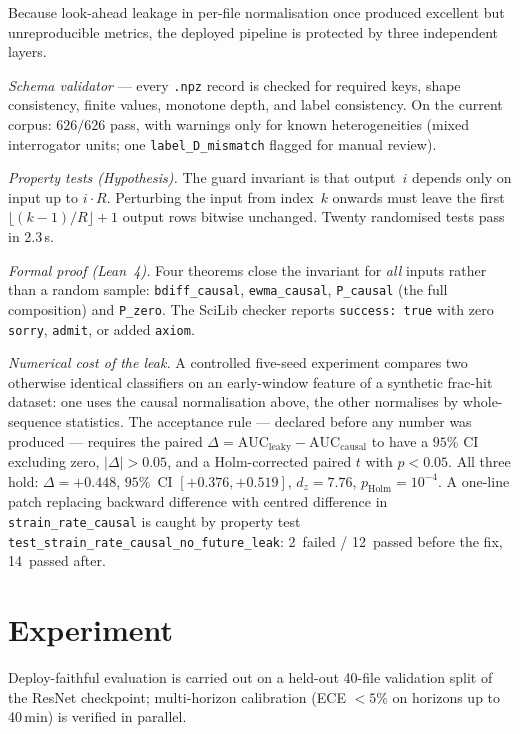 \documentclass{article}
\begin{document}
Because look-ahead leakage in per-file normalisation once produced
excellent but unreproducible metrics, the deployed pipeline is
protected by three independent layers.

\emph{Schema validator} --- every \texttt{.npz} record is checked for
required keys, shape consistency, finite values, monotone depth, and
label consistency. On the current corpus: $626/626$ pass, with
warnings only for known heterogeneities (mixed interrogator units; one
\texttt{label\_D\_mismatch} flagged for manual review).

\emph{Property tests (Hypothesis).} The guard invariant is that
output~$i$ depends only on input up to $i \cdot R$. Perturbing the
input from index~$k$ onwards must leave the first
$\lfloor (k-1)/R \rfloor + 1$ output rows bitwise unchanged.
Twenty randomised tests pass in 2.3\,s.

\emph{Formal proof (Lean~4).} Four theorems close the invariant for
\emph{all} inputs rather than a random sample:
\texttt{bdiff\_causal}, \texttt{ewma\_causal}, \texttt{P\_causal} (the
full composition) and \texttt{P\_zero}. The SciLib checker reports
\texttt{success:\,true} with zero \texttt{sorry}, \texttt{admit}, or
added \texttt{axiom}.

\emph{Numerical cost of the leak.} A controlled five-seed experiment
compares two otherwise identical classifiers on an early-window
feature of a synthetic frac-hit dataset: one uses the causal
normalisation above, the other normalises by whole-sequence
statistics. The acceptance rule --- declared before any number was
produced --- requires the paired
$\Delta = \mathrm{AUC}_\text{leaky} - \mathrm{AUC}_\text{causal}$ to
have a $95\%$ CI excluding zero, $|\Delta| > 0.05$, and a
Holm-corrected paired $t$ with $p < 0.05$. All three hold:
$\Delta = +0.448$, $95\%$~CI $[+0.376, +0.519]$, $d_z = 7.76$,
$p_\text{Holm} = 10^{-4}$. A one-line patch replacing backward
difference with centred difference in \texttt{strain\_rate\_causal}
is caught by property test
\texttt{test\_strain\_rate\_causal\_no\_future\_leak}:
2~failed / 12~passed before the fix, 14~passed after.

\section{Experiment}
\label{sec:experiment}

Deploy-faithful evaluation is carried out on a held-out 40-file
validation split of the ResNet checkpoint; multi-horizon calibration
(ECE $<5\%$ on horizons up to 40\,min) is verified in parallel.
\end{document}
